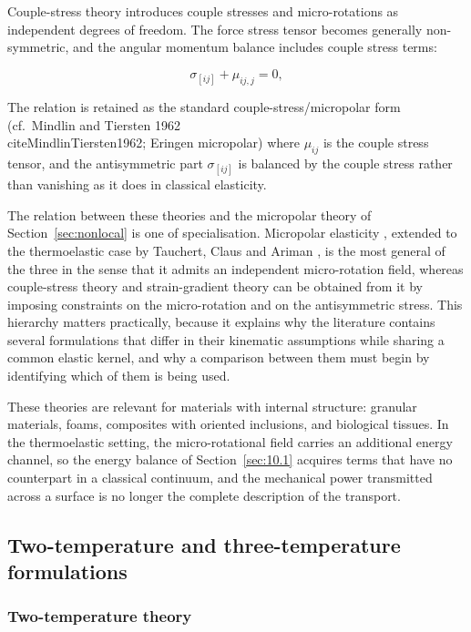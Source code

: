 Couple-stress theory introduces couple stresses and micro-rotations as independent degrees of freedom. The force stress tensor becomes generally non-symmetric, and the angular momentum balance includes couple stress terms:

\begin{equation}
\sigma_{[ij]} + \mu_{ij,j} = 0,
\label{eq:11.6}
\end{equation}

The relation is retained as the standard couple-stress/micropolar form (cf.\ Mindlin and Tiersten 1962 \\cite{MindlinTiersten1962}; Eringen micropolar) where $\mu_{ij}$ is the couple stress tensor, and the antisymmetric part $\sigma_{[ij]}$ is balanced by the couple stress rather than vanishing as it does in classical elasticity.

The relation between these theories and the micropolar theory of Section~\ref{sec:nonlocal} is one of specialisation. Micropolar elasticity \cite{Eringen1966a}, extended to the thermoelastic case by Tauchert, Claus and Ariman \cite{TauchertClausAriman1968}, is the most general of the three in the sense that it admits an independent micro-rotation field, whereas couple-stress theory and strain-gradient theory can be obtained from it by imposing constraints on the micro-rotation and on the antisymmetric stress. This hierarchy matters practically, because it explains why the literature contains several formulations that differ in their kinematic assumptions while sharing a common elastic kernel, and why a comparison between them must begin by identifying which of them is being used.

These theories are relevant for materials with internal structure: granular materials, foams, composites with oriented inclusions, and biological tissues. In the thermoelastic setting, the micro-rotational field carries an additional energy channel, so the energy balance of Section~\ref{sec:10.1} acquires terms that have no counterpart in a classical continuum, and the mechanical power transmitted across a surface is no longer the complete description of the transport.

\subsection{Two-temperature and three-temperature formulations}
\label{sec:11.3}

\subsubsection{Two-temperature theory}

